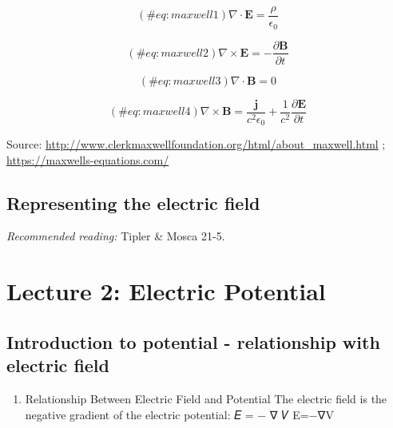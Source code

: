 \documentclass[
  letterpaper,
  DIV=11,
  numbers=noendperiod]{scrreprt}
\providecommand{\tightlist}{%
  \setlength{\itemsep}{0pt}\setlength{\parskip}{0pt}}\usepackage{longtable,booktabs,array}
\begin{document}
\begin{equation}
(\#eq:maxwell1)
\nabla \cdot \mathbf{E} = \frac{\rho}{\epsilon_0}
\end{equation}

\begin{equation}
(\#eq:maxwell2)
\nabla \times \mathbf{E} = - \frac{\partial \mathbf{B}}{\partial t} 
\end{equation}

\begin{equation}
(\#eq:maxwell3)
\nabla \cdot \mathbf{B} = 0
\end{equation}

\begin{equation}
(\#eq:maxwell4)
\nabla \times \mathbf{B} = \frac{\mathbf{j}}{c^2 \epsilon_0} + \frac{1}{c^2} \frac{\partial \mathbf{E}}{\partial t}
\end{equation}

Source:
\url{http://www.clerkmaxwellfoundation.org/html/about_maxwell.html} ;
\url{https://maxwells-equations.com/}

\section{Representing the electric
field}\label{representing-the-electric-field}

\emph{Recommended reading:} Tipler \& Mosca 21-5.


\chapter{Lecture 2: Electric
Potential}\label{lecture-2-electric-potential}

\section{Introduction to potential - relationship with electric
field}\label{introduction-to-potential---relationship-with-electric-field}

\begin{enumerate}
\def\labelenumi{\arabic{enumi}.}
\setcounter{enumi}{9}
\tightlist
\item
  Relationship Between Electric Field and Potential The electric field
  is the negative gradient of the electric potential: 𝐸 = − ∇ 𝑉 E=−∇V
\end{enumerate}

\end{document}
